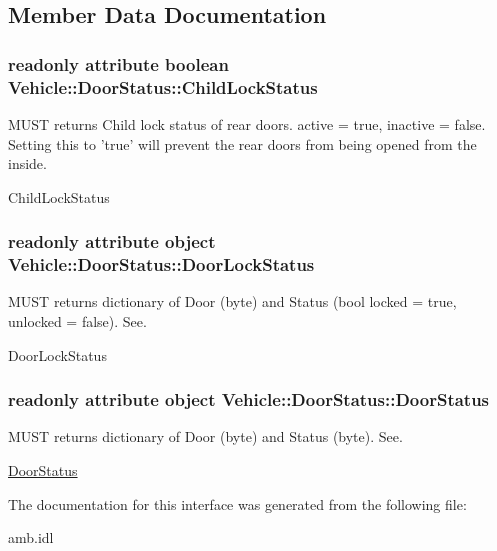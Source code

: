 \subsection{Member Data Documentation}
\hypertarget{interfaceVehicle_1_1DoorStatus_a09d583fc4050c982fb4e5105367f5c54}{
\subsubsection[{Child\-Lock\-Status}]{\setlength{\rightskip}{0pt plus 5cm}readonly attribute boolean Vehicle\-::\-Door\-Status\-::\-Child\-Lock\-Status}}\label{interfaceVehicle_1_1DoorStatus_a09d583fc4050c982fb4e5105367f5c54}


M\-U\-S\-T returns Child lock status of rear doors. active = true, inactive = false. Setting this to 'true' will prevent the rear doors from being opened from the inside. 

Child\-Lock\-Status \hypertarget{interfaceVehicle_1_1DoorStatus_a8c6bf40e9ad855cdf5c180c5fb6cfc7f}{
\subsubsection[{Door\-Lock\-Status}]{\setlength{\rightskip}{0pt plus 5cm}readonly attribute object Vehicle\-::\-Door\-Status\-::\-Door\-Lock\-Status}}\label{interfaceVehicle_1_1DoorStatus_a8c6bf40e9ad855cdf5c180c5fb6cfc7f}


M\-U\-S\-T returns dictionary of Door (byte) and Status (bool locked = true, unlocked = false). See. 

Door\-Lock\-Status \hypertarget{interfaceVehicle_1_1DoorStatus_ae777cde0e6de41279666e4b79bf5b9b0}{
\subsubsection[{Door\-Status}]{\setlength{\rightskip}{0pt plus 5cm}readonly attribute object Vehicle\-::\-Door\-Status\-::\-Door\-Status}}\label{interfaceVehicle_1_1DoorStatus_ae777cde0e6de41279666e4b79bf5b9b0}


M\-U\-S\-T returns dictionary of Door (byte) and Status (byte). See. 

\hyperlink{interfaceVehicle_1_1DoorStatus}{Door\-Status} 

The documentation for this interface was generated from the following file\-:\begin{DoxyCompactItemize}
\item 
amb.\-idl\end{DoxyCompactItemize}
